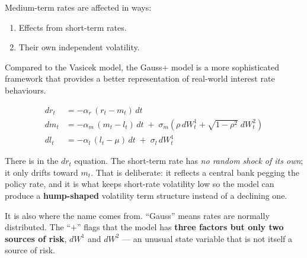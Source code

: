 \begin{mrkeybox}[title={Note on the medium-term factor}]
Medium-term rates are affected in  ways:
\begin{enumerate}
\item Effects from short-term rates.
\item Their own independent volatility.
\end{enumerate}
\end{mrkeybox}


Compared to the Vasicek model, the Gauss+ model is a more sophisticated 
framework that provides a better representation of real-world interest rate behaviours.

\begin{mrfmlbox}
\begin{align*}
dr_t &= -\alpha_r\,(r_t - m_t)\,dt\\[3pt]
dm_t &= -\alpha_m\,(m_t - l_t)\,dt \;+\; \sigma_m\!\left(\rho\,dW_t^{1}
        + \sqrt{1-\rho^{2}}\;dW_t^{2}\right)\\[3pt]
dl_t &= -\alpha_l\,(l_t - \mu)\,dt \;+\; \sigma_l\,dW_t^{1}
\end{align*}
\end{mrfmlbox}

\begin{mrtrapbox}[title={The single most examinable feature}]
There is  in the $dr_t$ equation. The short-term rate has \textit{no
random shock of its own}; it only drifts toward $m_t$. That is deliberate: it reflects a central
bank pegging the policy rate, and it is what keeps short-rate volatility low so the model can
produce a \textbf{hump-shaped} volatility term structure instead of a declining one.

\medskip
It is also where the name comes from. ``Gauss'' means rates are normally distributed. The
``$+$'' flags that the model has \textbf{three factors but only two sources of risk}, $dW^1$ and
$dW^2$ --- an unusual state variable that is not itself a source of risk.
\end{mrtrapbox}

